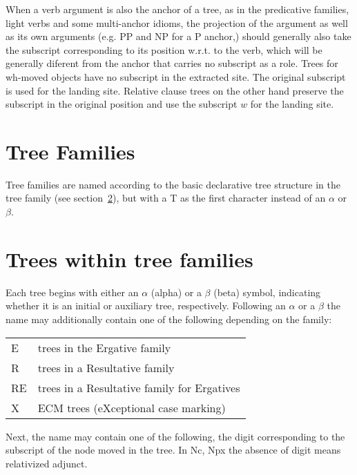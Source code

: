 When a verb argument is also the anchor of a tree, 
as in the predicative families, light verbs and some multi-anchor idioms,
the projection of the argument as well as its own arguments (e.g. PP and NP
for a P anchor,) 
should generally also take the subscript corresponding to its position w.r.t.
to the verb, which will be generally diferent from the anchor that carries
no subscript as a role.
Trees for wh-moved objects have no subscript in the extracted site. 
The original subscript is used for the landing site. 
Relative clause trees on the other hand 
preserve the subscript in the original position and use 
the subscript $w$ for the
landing site. 

\section{Tree Families}
Tree families are named according to the basic declarative tree structure in
the tree family (see section~\ref{family-trees}), but with a T as the first
character instead of an $\alpha$ or $\beta$.

\section{Trees within tree families}
\label{family-trees}

Each tree begins with either an $\alpha$ (alpha) or a $\beta$ (beta) symbol,
indicating whether it is an initial or auxiliary tree, respectively.  Following
an $\alpha$ or a $\beta$ the name may additionally contain one of the 
following depending on the family:

\begin{description}
\item\begin{tabular}{ll}
E& trees in the Ergative family\\
R& trees in a Resultative family\\
RE& trees in a Resultative family for Ergatives\\
X&ECM trees (eXceptional case marking)\\
\end{tabular}
\end{description}

\noindent Next, the name may contain one of the following,
the digit corresponding to the subscript of the node moved in the
tree. In Nc, Npx the absence of digit means relativized adjunct.

